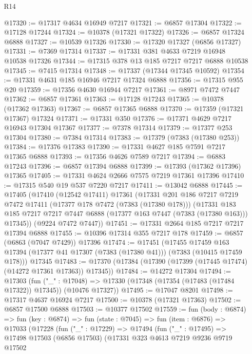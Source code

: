 \begin{lexlean}{R14}
\begin{coremodule}
@17320 := @17317 @4634 @16949 @7217
@17321 := @6857 @17304
@17322 := @17128 @17244
@17324 := @10378 (@17321 @17322)
@17326 := @6857 @17324 @6888
@17327 := @10539 @17326
@17330 := @17320 @17327 (@6856 @17327)
@17331 := @7369 @17314
@17337 := @17331 @381 @4633 @7219 @16948 @10538 @17326
@17344 := @17315 @378 @13 @185 @7217 @7217 @6888 @10538
@17345 := @7415 @17314
@17348 := @17337 (@17344 @17345 @10592)
@17354 := @17331 @4631 @185 @16946 @7217 @17324 @6888
@17356 := @17315 @955 @20
@17359 := @17356 @4630 @16944 @7217
@17361 := @8971 @7472 @7447
@17362 := @6857 @17361
@17363 := @17128 @17243
@17365 := @10378 (@17362 @17363)
@17367 := @6857 @17365 @6888
@17370 := @17359 (@17321 @17367) @17324
@17371 := @17331 @350
@17376 := @17371 @4629 @7217 @16943 @17304 @17367
@17377 := @7378 @17314
@17379 := @17377 @253 @17304
@17380 := @7384 @17314
@17383 := @17379 (@7383 (@17380 @253))
@17384 := @17376 @17383
@17390 := @17331 @4627 @185 @7591 @7217 @17365 @6888
@17393 := @17356 @4626 @7589 @7217
@17394 := @6883 @17243
@17396 := @6857 @17394 @6888
@17399 := @17393 (@17362 @17396) @17365
@17405 := @17331 @4624 @2666 @7575 @7219 @17361 @17396
@17410 := @17315 @540 @19 @537 @7220 @7217
@17411 := @13042 @6888
@17445 := @17405
    (@17410
      (@12542 @17411)
      @17361
      (@17331
        @201
        @186
        @7217
        @7219
        @7472
        @17411
        (@17377 @178 @7472 (@7383 (@17380 @178)))
        (@17331 @183 @185 @7217 @7217 @7447 @6888 (@17377 @163 @7447 (@7383 (@17380 @163))) @17345))
      (@9224 @7472 @7447))
@17451 := @17331 @2664 @185 @7217 @7217 @17394 @6888
@17455 := @10396 @17314 @355 @7217 @178
@17459 := @6857 (@6863 (@7047 @7429)) @17396
@17474 := @17451
    (@17455
      @17459
      @163
      @17394
      (@17377 @41 @17307 (@7383 (@17380 @41)))
      (@7383 (@10415 @17459 @178)))
    @17345
@17483 := @17370 (@17384 (@17390 (@17399 (@17445 @17474) (@14272 @17361 @17363)) @17345))
@17484 := @14272 @17304
@17494 := @17303
    (fun ("_" : @17048) => @17330 (@17348 (@17354 (@17483 (@17484 @17322)) @17345)) (@10476 @17327))
@17495 := @17047 @8201
@17498 := @17317 @4637 @16924 @7217
@17500 := @10378 (@17321 @17363)
@17502 := @6857 @17500 @6888
@17503 := @10377 @17502
@17559 := fun (body : @6874) =>
  fun (key : @6874) =>
  fun (state : @7045) =>
  fun (item : @6876) =>
  @17033
    (@17228
      (fun ("_" : @17229) =>
      @17494
        (fun ("_" : @17495) =>
        @17498
          @17503
          (@6856 @17503)
          (@17331
            @323
            @4613
            @7219
            @9236
            @9719
            @17502

\end{coremodule}
\end{lexlean}
